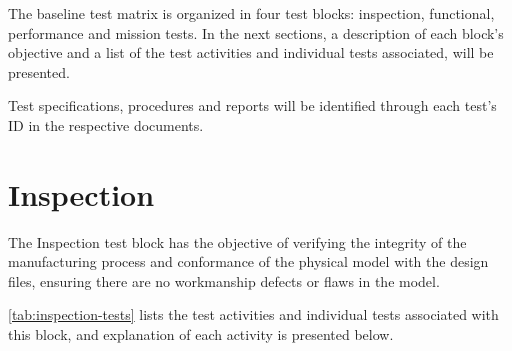 The baseline test matrix is organized in four test blocks: inspection, functional, performance and mission tests.
In the next sections, a description of each block's objective and a list of the test activities and individual tests associated, will be presented.

Test specifications, procedures and reports will be identified through each test's ID in the respective documents.


\section{Inspection}

The Inspection test block has the objective of verifying the integrity of the manufacturing process and conformance of the physical model with the design files, ensuring there are no workmanship defects or flaws in the model.

\autoref{tab:inspection-tests} lists the test activities and individual tests associated with this block, and explanation of each activity is presented below.

